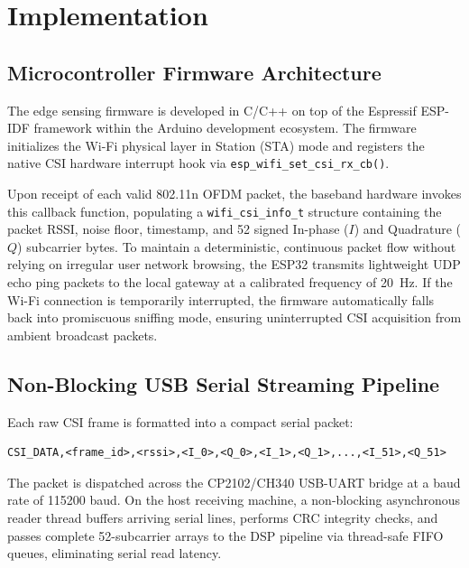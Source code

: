 \chapter{Implementation}
\label{chap:implementation}

\section{Microcontroller Firmware Architecture}
The edge sensing firmware is developed in C/C++ on top of the Espressif ESP-IDF framework within the Arduino development ecosystem. The firmware initializes the Wi-Fi physical layer in Station (STA) mode and registers the native CSI hardware interrupt hook via \texttt{esp\_wifi\_set\_csi\_rx\_cb()}. 

Upon receipt of each valid 802.11n OFDM packet, the baseband hardware invokes this callback function, populating a \texttt{wifi\_csi\_info\_t} structure containing the packet RSSI, noise floor, timestamp, and 52 signed In-phase ($I$) and Quadrature ($Q$) subcarrier bytes. To maintain a deterministic, continuous packet flow without relying on irregular user network browsing, the ESP32 transmits lightweight UDP echo ping packets to the local gateway at a calibrated frequency of 20~Hz. If the Wi-Fi connection is temporarily interrupted, the firmware automatically falls back into promiscuous sniffing mode, ensuring uninterrupted CSI acquisition from ambient broadcast packets.

\section{Non-Blocking USB Serial Streaming Pipeline}
Each raw CSI frame is formatted into a compact serial packet:
\begin{verbatim}
CSI_DATA,<frame_id>,<rssi>,<I_0>,<Q_0>,<I_1>,<Q_1>,...,<I_51>,<Q_51>
\end{verbatim}
The packet is dispatched across the CP2102/CH340 USB-UART bridge at a baud rate of 115200 baud. On the host receiving machine, a non-blocking asynchronous reader thread buffers arriving serial lines, performs CRC integrity checks, and passes complete 52-subcarrier arrays to the DSP pipeline via thread-safe FIFO queues, eliminating serial read latency.

